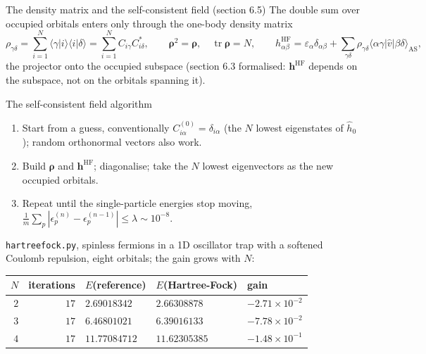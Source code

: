 \documentclass[aspectratio=169,10pt]{beamer}
\newcommand{\braket}[2]{\langle #1\vert #2\rangle}
\newcommand{\element}[3]{\langle #1\vert #2\vert #3\rangle}
\DeclareMathOperator{\tr}{tr}
\begin{document}
\begin{frame}[shrink=6]{The density matrix and the self-consistent field (section 6.5)}
  \footnotesize
  The double sum over occupied orbitals enters only through the one-body \alert{density matrix}
  \[
    \rho_{\gamma\delta}=\sum_{i=1}^{N}\braket{\gamma}{i}\braket{i}{\delta}=\sum_{i=1}^{N}C_{i\gamma}C_{i\delta}^{*},
    \qquad
    \bm{\rho}^2=\bm{\rho},\quad\tr\bm{\rho}=N,
    \qquad
    h^{\mathrm{HF}}_{\alpha\beta}=\varepsilon_\alpha\delta_{\alpha\beta}+\sum_{\gamma\delta}\rho_{\gamma\delta}\element{\alpha\gamma}{\hat{v}}{\beta\delta}_{\mathrm{AS}},
  \]
  the projector onto the occupied subspace (section 6.3 formalised: $\bm{h}^{\mathrm{HF}}$ depends on the subspace, not on the orbitals spanning it).
  \begin{block}{The self-consistent field algorithm}
    \begin{enumerate}
      \item Start from a guess, conventionally $C^{(0)}_{i\alpha}=\delta_{i\alpha}$ (the $N$ lowest eigenstates of $\hat{h}_0$); random orthonormal vectors also work.
      \item Build $\bm{\rho}$ and $\bm{h}^{\mathrm{HF}}$; diagonalise; take the $N$ lowest eigenvectors as the new occupied orbitals.
      \item Repeat until the single-particle energies stop moving, $\frac1m\sum_p|\epsilon_p^{(n)}-\epsilon_p^{(n-1)}|\le\lambda\sim10^{-8}$.
    \end{enumerate}
  \end{block}
  \texttt{hartreefock.py}, spinless fermions in a 1D oscillator trap with a softened Coulomb repulsion, eight orbitals; the gain grows with $N$:
  \begin{center}\scriptsize
  \begin{tabular}{rrlll}\toprule
  $N$ & iterations & $E$(reference) & $E$(Hartree-Fock) & gain\\\midrule
  $2$ & $17$ & $2.69018342$ & $2.66308878$ & $-2.71\times10^{-2}$\\
  $3$ & $17$ & $6.46801021$ & $6.39016133$ & $-7.78\times10^{-2}$\\
  $4$ & $17$ & $11.77084712$ & $11.62305385$ & $-1.48\times10^{-1}$\\\bottomrule
  \end{tabular}
  \end{center}
\end{frame}
\end{document}
